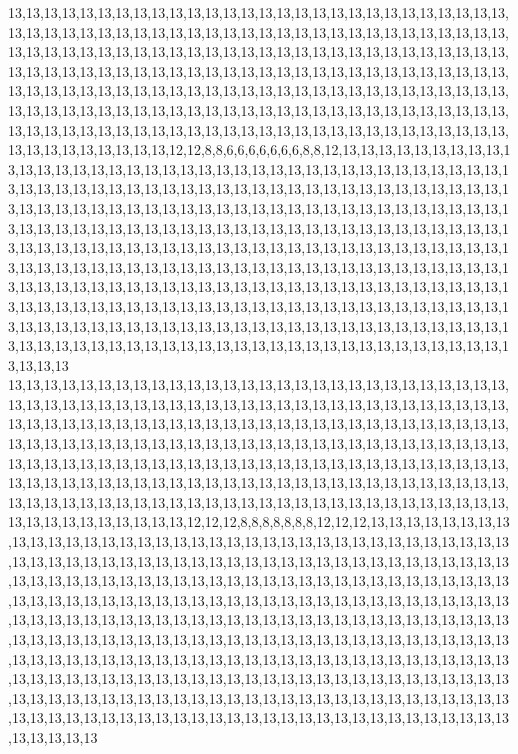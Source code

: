 13,13,13,13,13,13,13,13,13,13,13,13,13,13,13,13,13,13,13,13,13,13,13,13,13,13,13,13,13,13,13,13,13,13,13,13,13,13,13,13,13,13,13,13,13,13,13,13,13,13,13,13,13,13,13,13,13,13,13,13,13,13,13,13,13,13,13,13,13,13,13,13,13,13,13,13,13,13,13,13,13,13,13,13,13,13,13,13,13,13,13,13,13,13,13,13,13,13,13,13,13,13,13,13,13,13,13,13,13,13,13,13,13,13,13,13,13,13,13,13,13,13,13,13,13,13,13,13,13,13,13,13,13,13,13,13,13,13,13,13,13,13,13,13,13,13,13,13,13,13,13,13,13,13,13,13,13,13,13,13,13,13,13,13,13,13,13,13,13,13,13,13,13,13,13,13,13,13,13,13,13,13,13,13,13,13,13,13,13,13,13,13,13,13,13,13,13,13,13,13,13,13,13,13,13,12,12,8,8,6,6,6,6,6,6,6,8,8,12,13,13,13,13,13,13,13,13,13,13,13,13,13,13,13,13,13,13,13,13,13,13,13,13,13,13,13,13,13,13,13,13,13,13,13,13,13,13,13,13,13,13,13,13,13,13,13,13,13,13,13,13,13,13,13,13,13,13,13,13,13,13,13,13,13,13,13,13,13,13,13,13,13,13,13,13,13,13,13,13,13,13,13,13,13,13,13,13,13,13,13,13,13,13,13,13,13,13,13,13,13,13,13,13,13,13,13,13,13,13,13,13,13,13,13,13,13,13,13,13,13,13,13,13,13,13,13,13,13,13,13,13,13,13,13,13,13,13,13,13,13,13,13,13,13,13,13,13,13,13,13,13,13,13,13,13,13,13,13,13,13,13,13,13,13,13,13,13,13,13,13,13,13,13,13,13,13,13,13,13,13,13,13,13,13,13,13,13,13,13,13,13,13,13,13,13,13,13,13,13,13,13,13,13,13,13,13,13,13,13,13,13,13,13,13,13,13,13,13,13,13,13,13,13,13,13,13,13,13,13,13,13,13,13,13,13,13,13,13,13,13,13,13,13,13,13,13,13,13,13,13,13,13,13,13,13,13,13,13,13,13,13,13,13,13,13,13,13,13,13,13,13,13,13,13,13,13,13,13,13,13,13,13,13,13,13,13,13,13,13,13,13,13
13,13,13,13,13,13,13,13,13,13,13,13,13,13,13,13,13,13,13,13,13,13,13,13,13,13,13,13,13,13,13,13,13,13,13,13,13,13,13,13,13,13,13,13,13,13,13,13,13,13,13,13,13,13,13,13,13,13,13,13,13,13,13,13,13,13,13,13,13,13,13,13,13,13,13,13,13,13,13,13,13,13,13,13,13,13,13,13,13,13,13,13,13,13,13,13,13,13,13,13,13,13,13,13,13,13,13,13,13,13,13,13,13,13,13,13,13,13,13,13,13,13,13,13,13,13,13,13,13,13,13,13,13,13,13,13,13,13,13,13,13,13,13,13,13,13,13,13,13,13,13,13,13,13,13,13,13,13,13,13,13,13,13,13,13,13,13,13,13,13,13,13,13,13,13,13,13,13,13,13,13,13,13,13,13,13,13,13,13,13,13,13,13,13,13,13,13,13,13,13,13,13,13,13,13,13,12,12,12,8,8,8,8,8,8,8,12,12,12,13,13,13,13,13,13,13,13,13,13,13,13,13,13,13,13,13,13,13,13,13,13,13,13,13,13,13,13,13,13,13,13,13,13,13,13,13,13,13,13,13,13,13,13,13,13,13,13,13,13,13,13,13,13,13,13,13,13,13,13,13,13,13,13,13,13,13,13,13,13,13,13,13,13,13,13,13,13,13,13,13,13,13,13,13,13,13,13,13,13,13,13,13,13,13,13,13,13,13,13,13,13,13,13,13,13,13,13,13,13,13,13,13,13,13,13,13,13,13,13,13,13,13,13,13,13,13,13,13,13,13,13,13,13,13,13,13,13,13,13,13,13,13,13,13,13,13,13,13,13,13,13,13,13,13,13,13,13,13,13,13,13,13,13,13,13,13,13,13,13,13,13,13,13,13,13,13,13,13,13,13,13,13,13,13,13,13,13,13,13,13,13,13,13,13,13,13,13,13,13,13,13,13,13,13,13,13,13,13,13,13,13,13,13,13,13,13,13,13,13,13,13,13,13,13,13,13,13,13,13,13,13,13,13,13,13,13,13,13,13,13,13,13,13,13,13,13,13,13,13,13,13,13,13,13,13,13,13,13,13,13,13,13,13,13,13,13,13,13,13,13,13,13,13,13,13,13,13,13,13,13,13,13,13,13,13,13,13,13,13,13,13,13
